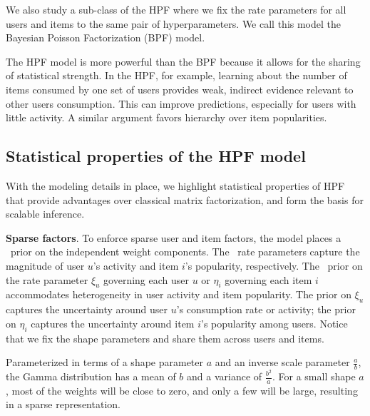 
We also study a sub-class of the HPF where we fix the rate parameters
for all users and items to the same pair of hyperparameters. We call
this model the Bayesian Poisson Factorization (BPF) model.

The HPF model is more powerful than the BPF because it allows for the
sharing of statistical strength. In the HPF, for example, learning
about the number of items consumed by one set of users provides weak,
indirect evidence relevant to other users consumption. This can
improve predictions, especially for users with little activity. A
similar argument favors hierarchy over item popularities.


\subsection{Statistical properties of the HPF model}
With the modeling details in place, we highlight statistical
properties of HPF that provide advantages over classical matrix
factorization, and form the basis for scalable inference.

{\bf Sparse factors}.
To enforce sparse user and item factors, the model places a \gam~prior
on the independent weight components. The \gam~rate parameters capture
the magnitude of user $u$'s activity and item $i$'s popularity,
respectively. The \gam~prior on the rate parameter $\xi_u$ governing
each user $u$ or $\eta_i$ governing each item $i$ accommodates
heterogeneity in user activity and item popularity. The prior on
$\xi_u$ captures the uncertainty around user $u$'s consumption rate or
activity; the prior on $\eta_i$ captures the uncertainty around item
$i$'s popularity among users. Notice that we fix the shape parameters
and share them across users and items.

Parameterized in terms of a shape parameter $a$ and an inverse scale
parameter $\frac{a}{b}$, the Gamma distribution has a mean of $b$ and
a variance of $\frac{b^2}{a}$. For a small shape $a$, most of the
weights will be close to zero, and only a few will be large, resulting
in a sparse representation.


